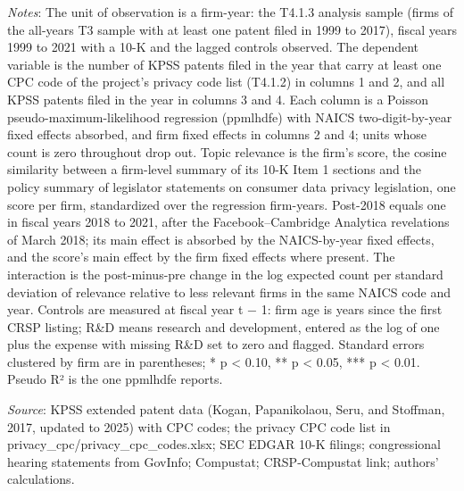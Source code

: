\begin{table}[htbp]
\par\textit{Notes}: The unit of observation is a firm-year: the T4.1.3 analysis sample (firms of the all-years T3 sample with at least one patent filed in 1999 to 2017), fiscal years 1999 to 2021 with a 10-K and the lagged controls observed. The dependent variable is the number of KPSS patents filed in the year that carry at least one CPC code of the project's privacy code list (T4.1.2) in columns 1 and 2, and all KPSS patents filed in the year in columns 3 and 4. Each column is a Poisson pseudo-maximum-likelihood regression (ppmlhdfe) with NAICS two-digit-by-year fixed effects absorbed, and firm fixed effects in columns 2 and 4; units whose count is zero throughout drop out. Topic relevance is the firm's score, the cosine similarity between a firm-level summary of its 10-K Item 1 sections and the policy summary of legislator statements on consumer data privacy legislation, one score per firm, standardized over the regression firm-years. Post-2018 equals one in fiscal years 2018 to 2021, after the Facebook–Cambridge Analytica revelations of March 2018; its main effect is absorbed by the NAICS-by-year fixed effects, and the score's main effect by the firm fixed effects where present. The interaction is the post-minus-pre change in the log expected count per standard deviation of relevance relative to less relevant firms in the same NAICS code and year. Controls are measured at fiscal year t − 1: firm age is years since the first CRSP listing; R\&D means research and development, entered as the log of one plus the expense with missing R\&D set to zero and flagged. Standard errors clustered by firm are in parentheses; * p < 0.10, ** p < 0.05, *** p < 0.01. Pseudo R² is the one ppmlhdfe reports.
\par\textit{Source}: KPSS extended patent data (Kogan, Papanikolaou, Seru, and Stoffman, 2017, updated to 2025) with CPC codes; the privacy CPC code list in privacy_cpc/privacy_cpc_codes.xlsx; SEC EDGAR 10-K filings; congressional hearing statements from GovInfo; Compustat; CRSP-Compustat link; authors' calculations.
\end{table}
